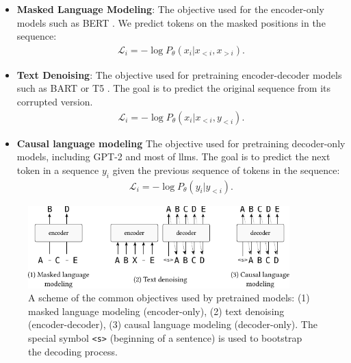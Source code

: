 {\begin{itemize}
    \item \textbf{Masked Language Modeling}: The objective used for the encoder-only models such as BERT \cite{devlinBERTPretrainingDeep2019}. We predict tokens on the masked positions in the sequence:
          \begin{align}
              \mathcal{L}_i = -\log P_\theta(x_i|x_{<i}, x_{>i}).
          \end{align}
    \item \textbf{Text Denoising}: The objective used for pretraining encoder-decoder models such as BART \cite{lewisBARTDenoisingSequencetoSequence2019} or T5 \cite{raffelExploringLimitsTransfer2019}. The goal is to predict the original sequence from its corrupted version.
          \begin{align}
              \mathcal{L}_i = -\log P_\theta(x_i|x_{<i}, y_{<i}).
          \end{align}
    \item \textbf{Causal language modeling} The objective used for pretraining decoder-only models, including GPT-2 \cite{radford2019language} and most of \acp{llm}. The goal is to predict the next token in a sequence $y_i$ given the previous sequence of tokens in the sequence:
          \begin{align}
              \mathcal{L}_i = -\log P_\theta(y_i|y_{<i}).
          \end{align}
\end{itemize}

\begin{figure}[t]
    \centering
    \includegraphics[width=0.9\textwidth]{img/objectives.pdf}
    \caption{A scheme of the common objectives used by pretrained models: (1) masked language modeling (encoder-only), (2) text denoising (encoder-decoder), (3)  causal language modeling (decoder-only). The special symbol \texttt{<s>} (beginning of a sentence) is used to bootstrap the decoding process.}\label{fig:objectives}
\end{figure}


}
